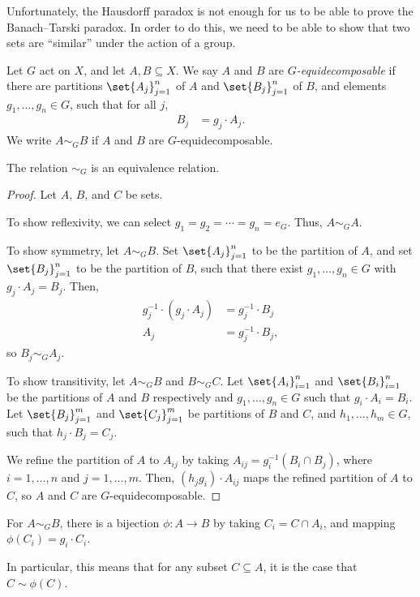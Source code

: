\documentclass[10pt]{mypackage2}
\begin{document}
Unfortunately, the Hausdorff paradox is not enough for us to be able to prove the Banach--Tarski paradox. In order to do this, we need to be able to show that two sets are ``similar'' under the action of a group.
\begin{definition}
  Let $G$ act on $X$, and let $A,B\subseteq X$. We say $A$ and $B$ are \textit{$G$-equidecomposable} if there are partitions $\set{A_j}_{j=1}^{n}$ of $A$ and $\set{B_j}_{j=1}^{n}$ of $B$, and elements $g_1,\dots,g_n\in G$, such that for all $j$,
  \begin{align*}
    B_j &= g_j\cdot A_j.
  \end{align*}
  We write $A\sim_{G}B$ if $A$ and $B$ are $G$-equidecomposable.
\end{definition}
\begin{fact}\label{fact:equidecomposability_equivalence_relation}
  The relation $\sim_{G}$ is an equivalence relation.
\end{fact}
\begin{proof}
  Let $A$, $B$, and $C$ be sets.\newline

  To show reflexivity, we can select $g_1 = g_2 = \cdots = g_n = e_G$. Thus, $A\sim_{G}A$.\newline

  To show symmetry, let $A\sim_{G} B$. Set $\set{A_j}_{j=1}^{n}$ to be the partition of $A$, and set $\set{B_j}_{j=1}^{n}$ to be the partition of $B$, such that there exist $g_1,\dots,g_n\in G$ with $g_j\cdot A_j = B_j$. Then,
  \begin{align*}
    g_j^{-1}\cdot \left(g_j\cdot A_j\right) &= g_j^{-1}\cdot B_j\\
    A_j &= g_j^{-1}\cdot B_j,
  \end{align*}
  so $B_j\sim_{G}A_j$.\newline

  To show transitivity, let $A\sim_{G} B$ and $B\sim_{G} C$. Let $\set{A_i}_{i=1}^{n}$ and $\set{B_i}_{i=1}^{n}$ be the partitions of $A$ and $B$ respectively and $g_1,\dots,g_n\in G$ such that $g_i\cdot A_i = B_i$. Let $\set{B_j}_{j=1}^{m}$ and $\set{C_j}_{j=1}^{m}$ be partitions of $B$ and $C$, and $h_1,\dots,h_m\in G$, such that $h_j\cdot B_j = C_j$.\newline

  We refine the partition of $A$ to $A_{ij}$ by taking $A_{ij} = g_i^{-1}\left(B_{i}\cap B_j\right)$, where $i = 1,\dots,n$ and $j = 1,\dots,m$. Then, $\left(h_jg_i\right)\cdot A_{ij}$ maps the refined partition of $A$ to $C$, so $A$ and $C$ are $G$-equidecomposable.
\end{proof}
\begin{fact}
  For $A\sim_{G} B$, there is a bijection $\phi\colon A\rightarrow B$ by taking $C_{i} = C\cap A_i$, and mapping $\phi\left(C_i\right) = g_i\cdot C_i$.\newline

  In particular, this means that for any subset $C\subseteq A$, it is the case that $C\sim \phi(C)$.\label{fact:bijections}
\end{fact}
\end{document}
